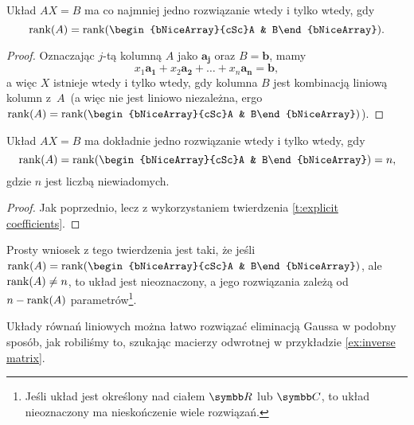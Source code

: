 \begin{theorem}
    \label{t:Kronecker-Cappelli}
    Układ $AX = B$ ma co najmniej jedno rozwiązanie wtedy i tylko wtedy, gdy
    \[ \rank(A) = \rank(\begin{bNiceArray}{cSc}A & B\end{bNiceArray}). \]
\end{theorem}
\begin{proof}
    Oznaczając $j$-tą kolumną $A$ jako $\symbf{a_j}$ oraz $B = \symbf{b}$, mamy
    \[ x_1\symbf{a_1} + x_2\symbf{a_2} + \ldots + x_n\symbf{a_n} = \symbf{b}, \]
    a więc $X$ istnieje wtedy i tylko wtedy, gdy kolumna $B$ jest kombinacją liniową kolumn z~$A$~(a więc nie jest liniowo niezależna, ergo $\rank(A) = \rank(\begin{bNiceArray}{cSc}A & B\end{bNiceArray})$).
\end{proof}

\begin{theorem}
    \label{t:rankA = rankA|B = n}
    Układ $AX = B$ ma dokładnie jedno rozwiązanie wtedy i tylko wtedy, gdy
    \[ \rank(A) = \rank(\begin{bNiceArray}{cSc}A & B\end{bNiceArray}) = n, \]
    gdzie $n$ jest liczbą niewiadomych.
\end{theorem}
\begin{proof}
    Jak poprzednio, lecz z wykorzystaniem twierdzenia \ref{t:explicit coefficients}.
\end{proof}

Prosty wniosek z tego twierdzenia jest taki, że jeśli $\rank(A) = \rank(\begin{bNiceArray}{cSc}A & B\end{bNiceArray})$, ale $\operatorname{rank}(A) \neq n$, to układ jest nieoznaczony, a jego rozwiązania zależą od $n - \operatorname{rank}(A)$ parametrów\footnote{Jeśli układ jest określony nad ciałem $\RR$ lub $\CC$, to układ nieoznaczony ma nieskończenie wiele rozwiązań.}.

Układy równań liniowych można łatwo rozwiązać eliminacją Gaussa w podobny sposób, jak robiliśmy to, szukając macierzy odwrotnej w przykładzie \ref{ex:inverse matrix}.

